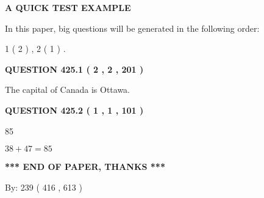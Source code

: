 \documentclass[12pt]{article}
\begin{document}
   
\vspace{0.2in}
   
   
   
   
   
   
 \vspace{0.2in}
{\LARGE {\textbf{ A QUICK TEST EXAMPLE}}}
   
   
   
\vspace{0.2in}
   
In this paper, big questions will be generated in the following order: 
   
   
   1 ( 2 )
 ,
   2 ( 1 )
 .
  
\vspace{0.2in}
  
{\textbf{\Large{QUESTION
425.1 
 ( 2 , 2 , 201 )
}}}
  
  
 
 
\noindent{}
 
 
The capital of Canada is Ottawa.
 
 
 
 
  
\vspace{0.2in}
  
{\textbf{\Large{QUESTION
425.2 
 ( 1 , 1 , 101 )
}}}
  
  
 
 
\noindent{}

85
 
 
 
 
\noindent{}

$ %
38 +  %
47=   %
85$
 
 
   
   
 \vspace{0.2in}
 
   
   
   
   
\vspace{1.0in} 
{\textbf{\large{ *** END OF PAPER, THANKS *** }}} 
   
   
\hspace{1.0in} By: 
 239 ( 416 ,  613 )
   
   
   
\end{document}
